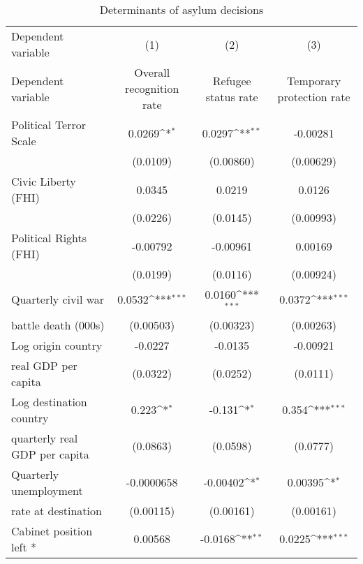 \begin{table}[!ht]\centering \scriptsize
\def\sym#1{\ifmmode^{#1}\else\(^{#1}\)\fi}
\caption{Determinants of asylum decisions}
\begin{tabular}{l*{3}{c}}
\hline\hline
Dependent variable                    &\multicolumn{1}{c}{(1)}&\multicolumn{1}{c}{(2)}&\multicolumn{1}{c}{(3)}\\
Dependent variable                    &\multicolumn{1}{c}{Overall recognition rate}&\multicolumn{1}{c}{Refugee status rate}&\multicolumn{1}{c}{Temporary protection rate}\\
\hline
Political Terror Scale&      0.0269\sym{*}  &      0.0297\sym{**} &    -0.00281         \\
                    &    (0.0109)         &   (0.00860)         &   (0.00629)         \\
[0.5em]
Civic Liberty (FHI) &      0.0345         &      0.0219         &      0.0126         \\
                    &    (0.0226)         &    (0.0145)         &   (0.00993)         \\
[0.5em]
Political Rights (FHI)&    -0.00792         &    -0.00961         &     0.00169         \\
                    &    (0.0199)         &    (0.0116)         &   (0.00924)         \\
[0.5em]
Quarterly civil war &      0.0532\sym{***}&      0.0160\sym{***}&      0.0372\sym{***}\\
battle death (000s)                    &   (0.00503)         &   (0.00323)         &   (0.00263)         \\
[0.5em]
Log origin country &     -0.0227         &     -0.0135         &    -0.00921         \\
real GDP per capita                    &    (0.0322)         &    (0.0252)         &    (0.0111)         \\
[0.5em]
Log destination country&       0.223\sym{*}  &      -0.131\sym{*}  &       0.354\sym{***}\\
 quarterly real GDP per capita                    &    (0.0863)         &    (0.0598)         &    (0.0777)         \\
[0.5em]
Quarterly unemployment &  -0.0000658         &    -0.00402\sym{*}  &     0.00395\sym{*}  \\
rate at destination                    &   (0.00115)         &   (0.00161)         &   (0.00161)         \\
[0.5em]
Cabinet position left * &     0.00568         &     -0.0168\sym{**} &      0.0225\sym{***}\\

\end{tabular}
\end{table}
